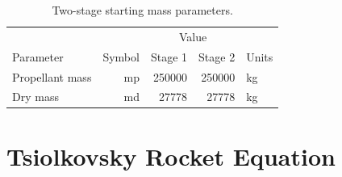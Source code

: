 \documentclass[12pt,openany]{book}
\begin{document}
\begin{table}
  \centering
  \begin{tabular}[htbp]{ l r r r l }
    \toprule
                    &          & \multicolumn{2}{c}{Value}    &           \\ \cmidrule{3-4}
    Parameter       & Symbol   & Stage 1      & Stage 2       & Units     \\ \midrule
    Propellant mass & \gls{mp} & \num{250000} & \num{250000}  & \si{kg}   \\
    Dry mass        & \gls{md} & \num{27778}  & \num{27778}   & \si{kg}   \\
    \bottomrule
  \end{tabular}
  \caption{Two-stage starting mass parameters.}
  \label{tab:two-stage}
\end{table}



\section{Tsiolkovsky Rocket Equation}


\printunsrtglossary[type=symbols,style=long]

\clearpage{}
{}


\end{document}
